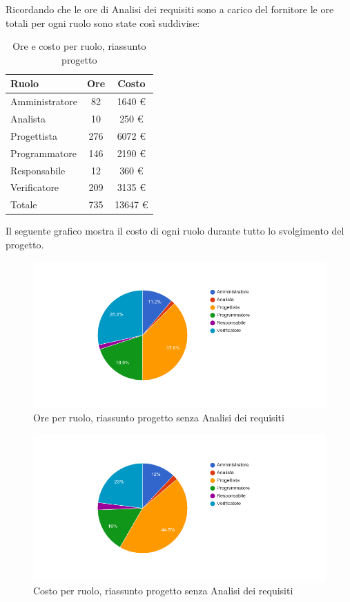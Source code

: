 Ricordando che le ore di Analisi dei requisiti sono a carico del fornitore le ore totali per ogni ruolo sono state così suddivise:
\begin{table}[H]
	\centering
	\begin{tabular}{ l c c }
		\textbf{Ruolo} & \textbf{Ore} & \textbf{Costo} \\
		\hline
		Amministratore & 82 & 1640 \euro{} \\
		Analista & 10 & 250 \euro{} \\
		Progettista & 276 & 6072 \euro{} \\
		Programmatore & 146 & 2190 \euro{} \\
		Responsabile & 12 & 360 \euro{} \\
		Verificatore & 209 & 3135 \euro{} \\
		\hline
		Totale & 735 & 13647 \euro{} \\
		\hline
	\end{tabular}
	\caption{Ore e costo per ruolo, riassunto progetto}
\end{table}

Il seguente grafico mostra il costo di ogni ruolo durante tutto lo svolgimento del progetto.

\begin{figure}[H]
  \begin{center}
    \includegraphics[width=15cm]{res/img/prospettoEconomico/orePerRuoloRiassuntoSenzaAnalisi.png}
  \caption{Ore per ruolo, riassunto progetto senza Analisi dei requisiti}
  \end{center} 
\end{figure}  

\begin{figure}[H]
  \begin{center}
    \includegraphics[width=15cm]{res/img/prospettoEconomico/costoPerRuoloRiassuntoSenzaAnalisi.png}
  \caption{Costo per ruolo, riassunto progetto senza Analisi dei requisiti}
  \end{center} 
\end{figure}  

\newpage